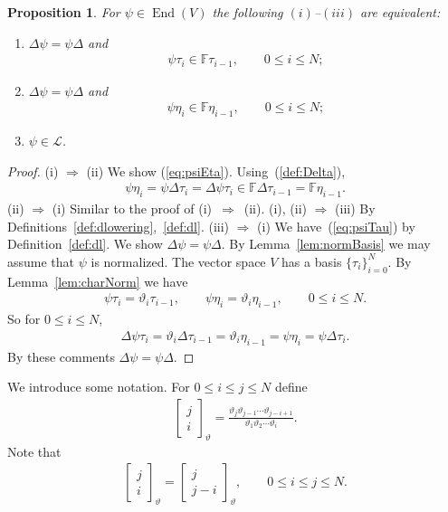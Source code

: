 \documentclass[pdftex]{sigma}
\numberwithin{equation}{section}
\newtheorem{Proposition}[Theorem]{Proposition}
\begin{document}
\begin{Proposition}\label{prop:Delta}
For $\psi \in \operatorname{End}(V)$ the following $(i)$--$(iii)$
are equivalent:
\begin{enumerate}\itemsep=0pt
\item[$(i)$] $\Delta \psi = \psi \Delta$ and
\begin{gather}\label{eq:psiTau}
\psi \tau_i \in \mathbb F \tau_{i-1}, \qquad 0 \leq i \leq N;
\end{gather}
\item[$(ii)$] $\Delta \psi = \psi \Delta$ and
\begin{gather}\label{eq:psiEta}
\psi \eta_i \in \mathbb F \eta_{i-1}, \qquad 0 \leq i \leq N;
\end{gather}
\item[$(iii)$] $\psi \in \mathcal L$.
\end{enumerate}
\end{Proposition}
\begin{proof}
(i) $\Rightarrow$ (ii) We show (\ref{eq:psiEta}). Using~(\ref{def:Delta}),
\begin{gather*}
\psi \eta_i = \psi \Delta \tau_i = \Delta \psi \tau_i \in \mathbb F \Delta \tau_{i-1} = \mathbb F \eta_{i-1}.
\end{gather*}
(ii) $\Rightarrow$ (i) Similar to the proof of (i)~$\Rightarrow$~(ii).
(i), (ii) $\Rightarrow$ (iii) By Definitions~\ref{def:dlowering},~\ref{def:dl}.
(iii) $\Rightarrow$ (i) We have~(\ref{eq:psiTau}) by Definition~\ref{def:dl}. We show $\Delta \psi = \psi \Delta$.
By Lemma~\ref{lem:normBasis} we may assume that $\psi$ is normalized.
The vector space $V$ has a basis $\lbrace \tau_i \rbrace_{i=0}^N$.
By Lemma~\ref{lem:charNorm}
we have
\begin{gather*}
\psi \tau_i = \vartheta_i \tau_{i-1}, \qquad
\psi \eta_i = \vartheta_i \eta_{i-1}, \qquad 0 \leq i \leq N.
\end{gather*}
So for $0 \leq i \leq N$,
\begin{gather*}
\Delta \psi \tau_i = \vartheta_i \Delta \tau_{i-1} =
\vartheta_i \eta_{i-1} = \psi \eta_i = \psi \Delta \tau_i.
\end{gather*}
By these comments $\Delta \psi = \psi \Delta$.
\end{proof}

We introduce some notation. For $0 \leq i\leq j\leq N$
define
\begin{gather}
\left[\begin{matrix} j \\
i \end{matrix} \right]_\vartheta =
\frac{
\vartheta_j \vartheta_{j-1} \cdots \vartheta_{j-i+1}}
{\vartheta_1 \vartheta_2 \cdots \vartheta_i}.
\label{eq:brackij}
\end{gather}
Note that
\begin{gather*}
\left[\begin{matrix} j \\
i \end{matrix} \right]_\vartheta =
\left[\begin{matrix} j \\
j-i \end{matrix} \right]_\vartheta,
 \qquad 0 \leq i \leq j \leq N.
\end{gather*}
\end{document}
